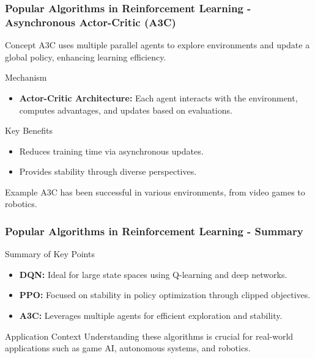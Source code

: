 \documentclass[aspectratio=169]{beamer}
\begin{document}
\begin{frame}[fragile]
    \frametitle{Popular Algorithms in Reinforcement Learning - Asynchronous Actor-Critic (A3C)}
    \begin{block}{Concept}
        A3C uses multiple parallel agents to explore environments and update a global policy, enhancing learning efficiency.
    \end{block}
    \begin{block}{Mechanism}
        \begin{itemize}
            \item \textbf{Actor-Critic Architecture:} Each agent interacts with the environment, computes advantages, and updates based on evaluations.
        \end{itemize}
    \end{block}
    \begin{block}{Key Benefits}
        \begin{itemize}
            \item Reduces training time via asynchronous updates.
            \item Provides stability through diverse perspectives.
        \end{itemize}
    \end{block}
    \begin{block}{Example}
        A3C has been successful in various environments, from video games to robotics.
    \end{block}
\end{frame}

\begin{frame}[fragile]
    \frametitle{Popular Algorithms in Reinforcement Learning - Summary}
    \begin{block}{Summary of Key Points}
        \begin{itemize}
            \item \textbf{DQN:} Ideal for large state spaces using Q-learning and deep networks.
            \item \textbf{PPO:} Focused on stability in policy optimization through clipped objectives.
            \item \textbf{A3C:} Leverages multiple agents for efficient exploration and stability.
        \end{itemize}
    \end{block}
    \begin{block}{Application Context}
        Understanding these algorithms is crucial for real-world applications such as game AI, autonomous systems, and robotics.
    \end{block}
\end{frame}
\end{document}
